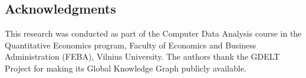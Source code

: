 \documentclass[5p,12pt]{elsarticle}
\begin{document}
\subsection*{Acknowledgments}
This research was conducted as part of the Computer Data Analysis course in the Quantitative Economics program, Faculty of Economics and Business Administration (FEBA), Vilnius University. The authors thank the GDELT Project for making its Global Knowledge Graph publicly available.



\end{document}
